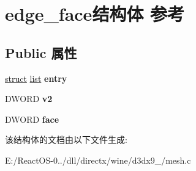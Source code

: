 \hypertarget{structedge__face}{}\section{edge\+\_\+face结构体 参考}
\label{structedge__face}
\subsection*{Public 属性}
\begin{DoxyCompactItemize}
\item 
\mbox{\label{structedge__face_a076451c8164486f45ab61187ea40a805}} 
\hyperlink{interfacestruct}{struct} \hyperlink{classlist}{list} {\bfseries entry}
\item 
\mbox{\label{structedge__face_a0b1d94da1dd626f339c2919f75a2114d}} 
D\+W\+O\+RD {\bfseries v2}
\item 
\mbox{\label{structedge__face_a7fdc78338269881042c16a0fa5dcebb4}} 
D\+W\+O\+RD {\bfseries face}
\end{DoxyCompactItemize}


该结构体的文档由以下文件生成\+:\begin{DoxyCompactItemize}
\item 
E\+:/\+React\+O\+S-\/0../dll/directx/wine/d3dx9\+\_/mesh.\+c\end{DoxyCompactItemize}
